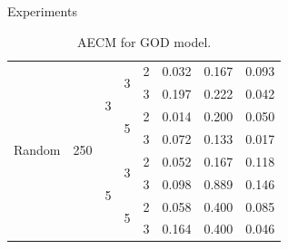 \documentclass{beamer}
\begin{document}
\begin{frame}{Experiments}
\begin{table}[H]
\begin{minipage}{.48\columnwidth}
\begin{adjustbox}{width=\columnwidth}
\begin{tabular}{lllllrrr}
                    \cline{1-8} \cline{2-8} \cline{3-8} \cline{4-8}
                    \multirow[t]{16}{*}{Random} & \multirow[t]{8}{*}{250} & \multirow[t]{4}{*}{3} & \multirow[t]{2}{*}{3} & 2          & 0.032           & 0.167        & 0.093        \\
                                                &                         &                       &                       & 3          & 0.197           & 0.222        & 0.042        \\
                    \cline{4-8}
                                                &                         &                       & \multirow[t]{2}{*}{5} & 2          & 0.014           & 0.200        & 0.050        \\
                                                &                         &                       &                       & 3          & 0.072           & 0.133        & 0.017        \\
                    \cline{3-8} \cline{4-8}
                                                &                         & \multirow[t]{4}{*}{5} & \multirow[t]{2}{*}{3} & 2          & 0.052           & 0.167        & 0.118        \\
                                                &                         &                       &                       & 3          & 0.098           & 0.889        & 0.146        \\
                    \cline{4-8}
                                                &                         &                       & \multirow[t]{2}{*}{5} & 2          & 0.058           & 0.400        & 0.085        \\
                                                &                         &                       &                       & 3          & 0.164           & 0.400        & 0.046        \\
                    \cline{1-8} \cline{2-8} \cline{3-8} \cline{4-8}
                \end{tabular}
            \end{adjustbox}
            \caption*{AECM for GOD model.}
            \label{tab:results_god}
        \end{minipage}
    \end{table}
\end{frame}
\end{document}
